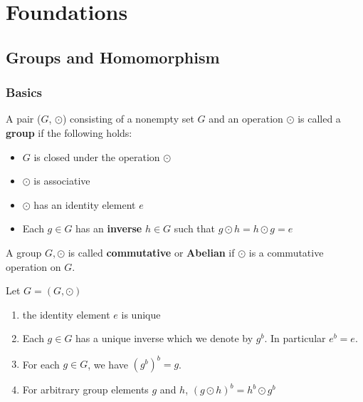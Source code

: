 

\part{Foundations}
\chapter{Groups and Homomorphism}\label{ch:group}
\section{Basics}
\begin{definition}[Group]\label{def:group}
	A pair (\(G\), \(\odot	\)) consisting of a nonempty set \(G\) and an operation \(\odot\)
	is called a \textbf{group} if the following holds:
	\begin{itemize}
		\item \(G\) is closed under the operation \(\odot\)
		\item \(\odot\) is associative
		\item \(\odot\) has an identity element \(e\)
		\item Each \(g \in G\) has an \textbf{inverse} \(h \in G\) such that \(g \odot h = h \odot g = e\)
	\end{itemize}
	
\end{definition}

\begin{definition}\label{def:abelian-group}
	A group \(G, \odot\) is called \textbf{commutative} or \textbf{Abelian}
	if \(\odot\) is a commutative operation on \(G\).
\end{definition}

\begin{remark} 
	Let \(G = \left(G, \odot\right) \)
	\begin{enumerate}[label=(\alph*)]
		\item the identity element \(e\) is unique
		\item Each \(g \in G\) has a unique inverse which we denote by \(g^b\). In particular \(e^b = e\).
		\item For each \(g \in G\), we have \(\left(g^b\right)^b = g\). 
		\item For arbitrary group elements \(g\) and \(h\), \(\left(g \odot h\right)^b = h^b \odot g^b\)
	\end{enumerate}
\end{remark}


